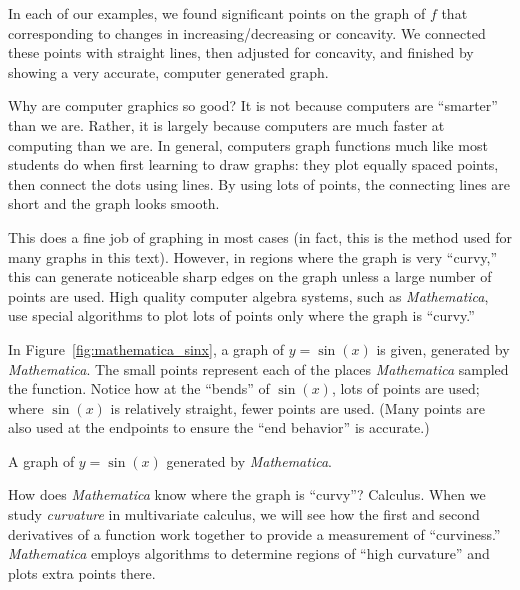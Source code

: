 \pagebreak

\vspace*{-.25cm}




In each of our examples, we found significant points on the graph of $f$ that corresponding to changes in increasing/decreasing or concavity. We connected these points with straight lines, then adjusted for concavity, and finished by showing a very accurate, computer generated graph.

Why are computer graphics so good? It is not because computers are ``smarter'' than we are. Rather, it is largely because computers are much faster at computing than we are. In general, computers graph functions much like most students do when first learning to draw graphs: they plot equally spaced points, then connect the dots using lines. By using lots of points, the connecting lines are short and the graph looks smooth. 

This does a fine job of graphing in most cases (in fact, this is the method used for many graphs in this text). However, in regions where the graph is very ``curvy,'' this can generate noticeable sharp edges on the graph unless a large number of points are used. High quality computer algebra systems, such as \textit{Mathematica}, use special algorithms to plot lots of points only where the graph is ``curvy.''

In Figure~\ref{fig:mathematica_sinx}, a graph of $y=\sin(x)$ is given, generated by \textit{Mathematica}. The small points represent each of the places \textit{Mathematica} sampled the function. Notice how at the ``bends'' of $\sin(x)$, lots of points are used; where $\sin(x)$ is relatively straight, fewer points are used. (Many points are also used at the endpoints to ensure the ``end behavior'' is accurate.) 

\begin{marginfigure} %
\caption{A graph of $y=\sin(x)$ generated by \textit{Mathematica}.}\label{fig:mathematica_sinx}
\end{marginfigure}

How does \textit{Mathematica} know where the graph is ``curvy''? Calculus. When we study \textit{curvature} in multivariate calculus, we will see how the first and second derivatives of a function work together to provide a measurement of ``curviness.'' \textit{Mathematica} employs algorithms to determine regions of ``high curvature'' and plots extra points there.

